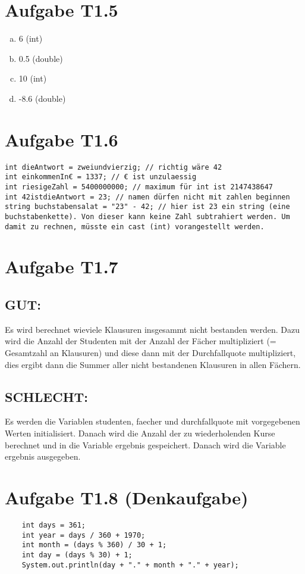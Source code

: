 \documentclass[final,a4paper]{article}
\begin{document}
\section*{Aufgabe T1.5}
\begin{enumerate}[(a)]
\item 6 	(int) 
\item 0.5 	(double)
\item 10 	(int)
\item -8.6 	(double)
\end{enumerate}
\section*{Aufgabe T1.6}
\begin{lstlisting}
int dieAntwort = zweiundvierzig; // richtig wäre 42
int einkommenIn€ = 1337; // € ist unzulaessig
int riesigeZahl = 5400000000; // maximum für int ist 2147438647
int 42istdieAntwort = 23; // namen dürfen nicht mit zahlen beginnen
string buchstabensalat = "23" - 42; // hier ist 23 ein string (eine buchstabenkette). Von dieser kann keine Zahl subtrahiert werden. Um damit zu rechnen, müsste ein cast (int) vorangestellt werden.
\end{lstlisting}
\section*{Aufgabe T1.7}
\subsection*{GUT:}
Es wird berechnet wieviele Klausuren insgesammt nicht bestanden werden. Dazu wird die Anzahl der Studenten mit der Anzahl der Fächer multipliziert (= Gesamtzahl an Klausuren) und diese dann mit der Durchfallquote multipliziert, dies ergibt dann die Summer aller nicht bestandenen Klausuren in allen Fächern.

\subsection*{SCHLECHT:}
Es werden die Variablen studenten, faecher und durchfallquote mit vorgegebenen Werten initialisiert. Danach wird die Anzahl der zu wiederholenden Kurse berechnet und in die Variable ergebnis gespeichert. Danach wird die Variable ergebnis ausgegeben.
\section*{Aufgabe T1.8 (Denkaufgabe)}
\begin{lstlisting}
	int days = 361;
	int year = days / 360 + 1970;
	int month = (days % 360) / 30 + 1;
	int day = (days % 30) + 1;
	System.out.println(day + "." + month + "." + year);
\end{lstlisting}
\end{document}
